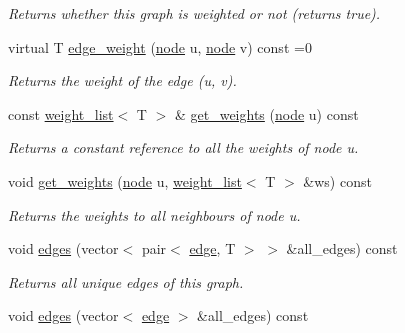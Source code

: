 \begin{DoxyCompactItemize}
\begin{DoxyCompactList}\small\item\em Returns whether this graph is weighted or not (returns true). \end{DoxyCompactList}\item 
virtual T \hyperlink{classlgraph_1_1utils_1_1wxgraph_ae634779d8d7f973fb7b7d2d9fb33c5c2}{edge\-\_\-weight} (\hyperlink{namespacelgraph_1_1utils_a7bd66ede3805ef121bc2835bd48de0cf}{node} u, \hyperlink{namespacelgraph_1_1utils_a7bd66ede3805ef121bc2835bd48de0cf}{node} v) const =0
\begin{DoxyCompactList}\small\item\em Returns the weight of the edge ({\itshape u}, {\itshape v}). \end{DoxyCompactList}\item 
const \hyperlink{namespacelgraph_1_1utils_a11e7963f3637ea13778b8d3e69d2c17f}{weight\-\_\-list}$<$ T $>$ \& \hyperlink{classlgraph_1_1utils_1_1wxgraph_a06252e99191d39329947c3a5eef43e73}{get\-\_\-weights} (\hyperlink{namespacelgraph_1_1utils_a7bd66ede3805ef121bc2835bd48de0cf}{node} u) const 
\begin{DoxyCompactList}\small\item\em Returns a constant reference to all the weights of node {\itshape u}. \end{DoxyCompactList}\item 
void \hyperlink{classlgraph_1_1utils_1_1wxgraph_a23c629eb031e31681749da793f933548}{get\-\_\-weights} (\hyperlink{namespacelgraph_1_1utils_a7bd66ede3805ef121bc2835bd48de0cf}{node} u, \hyperlink{namespacelgraph_1_1utils_a11e7963f3637ea13778b8d3e69d2c17f}{weight\-\_\-list}$<$ T $>$ \&ws) const 
\begin{DoxyCompactList}\small\item\em Returns the weights to all neighbours of node {\itshape u}. \end{DoxyCompactList}\item 
void \hyperlink{classlgraph_1_1utils_1_1wxgraph_a73b6c8887d5088750ee2cc98c45089c6}{edges} (vector$<$ pair$<$ \hyperlink{namespacelgraph_1_1utils_a6510284ce1b1ae5dc97ce5d2de426e10}{edge}, T $>$ $>$ \&all\-\_\-edges) const 
\begin{DoxyCompactList}\small\item\em Returns all unique edges of this graph. \end{DoxyCompactList}\item 
void \hyperlink{classlgraph_1_1utils_1_1wxgraph_a6c58b1f9bd596b3a12c181119eee9da2}{edges} (vector$<$ \hyperlink{namespacelgraph_1_1utils_a6510284ce1b1ae5dc97ce5d2de426e10}{edge} $>$ \&all\-\_\-edges) const 

\end{DoxyCompactItemize}
